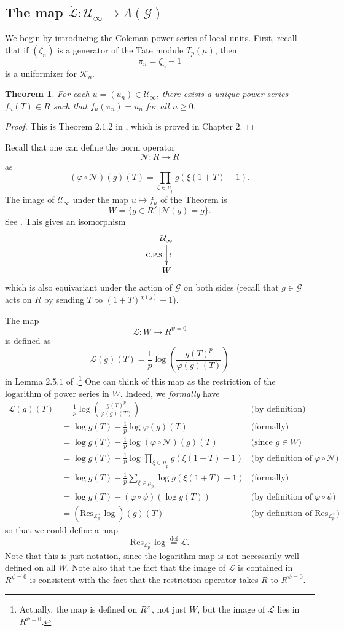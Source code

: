 \documentclass[twoside,10pt]{article}
\newtheorem{theorem}{Theorem}
\newcommand{\rarr}{\rightarrow}
\newcommand{\Z}{\mathbb{Z}}
\newcommand{\curlG}{\mathcal{G}}
\newcommand{\curlU}{\mathcal{U}}
\newcommand{\curlK}{\mathcal{K}}
\newcommand{\curlN}{\mathcal{N}}
\newcommand{\curlL}{\mathcal{L}}
\newcommand{\eqdef}{\overset{\text{def}}{=}}
\newcommand{\Res}{\text{Res}_{\Z_p^\times}}
\begin{document}
\subsection{The map $\tilde{\curlL}:\curlU_\infty\rarr\Lambda(\curlG)$}
We begin by introducing the Coleman power series of local units. First, recall that if $(\zeta_n)$ is a generator of the Tate module $T_p(\mu)$, then
\[\pi_n=\zeta_n-1\]
is a uniformizer for $\curlK_n$.

\begin{theorem}
	For each $u=(u_n)\in\curlU_\infty$, there exists a unique power series $f_u(T)\in R$ such that $f_u(\pi_n)=u_n$ for all $n\geq0$.
\end{theorem}
\begin{proof}
	This is Theorem $2.1.2$ in \cite{CS}, which is proved in Chapter $2$.
\end{proof}

Recall that one can define the norm operator
\[\curlN:R\rarr R\]
as
\[(\varphi\circ\curlN)(g)(T)=\prod_{\xi\in\mu_p}g(\xi(1+T)-1).\]
The image of $\curlU_\infty$ under the map $u\mapsto f_u$ of the Theorem is
\[W=\{g\in R^\times|\curlN(g)=g\}.\]
See \cite[Corollary 2.3.7]{CS}. This gives an isomorphism
\[\xymatrix{
\curlU_\infty\ar[d]_{\text{C.P.S.}}^{\wr}\\
W
}\]
which is also equivariant under the action of $\curlG$ on both sides (recall that $g\in\curlG$ acts on $R$ by sending $T$ to $(1+T)^{\chi(g)}-1$).

The map
\[\curlL:W\rarr R^{\psi=0}\]
is defined as
\[\curlL(g)(T)=\frac{1}{p}\log\left (\frac{g(T)^p}{\varphi(g)(T)}\right )\]
in Lemma $2.5.1$ of \cite{CS}.\footnote{Actually, the map is defined on $R^\times$, not just $W$, but the image of $\curlL$ lies in $R^{\psi=0}$.} One can think of this map as the restriction of the logarithm of power series in $W$. Indeed, we \emph{formally} have
\begin{align*}
	\curlL(g)(T)	&= \frac{1}{p}\log\left (\frac{g(T)^p}{\varphi(g)(T)}\right ) 	&\text{(by definition)}\\
					&= \log g(T) - \frac{1}{p}\log\varphi(g)(T)						&\text{(formally)}\\
					&= \log g(T) - \frac{1}{p}\log(\varphi\circ\curlN)(g)(T)		&\text{(since $g\in W$)}\\
					&= \log g(T) - \frac{1}{p}\log\prod_{\xi\in\mu_p}g(\xi(1+T)-1)	&\text{(by definition of $\varphi\circ\curlN$)}\\
					&= \log g(T) - \frac{1}{p}\sum_{\xi\in\mu_p}\log g(\xi(1+T)-1)	&\text{(formally)}\\
					&= \log g(T) - (\varphi\circ\psi)(\log g(T))					&\text{(by definition of $\varphi\circ\psi$)}\\
					&= (\Res\log)(g)(T)											&\text{(by definition of $\Res$)}
\end{align*}
so that we could define a map
\[\Res\log\eqdef\curlL.\]
Note that this is just notation, since the logarithm map is not necessarily well-defined on all $W$. Note also that the fact that the image of $\curlL$ is contained in $R^{\psi=0}$ is consistent with the fact that the restriction operator takes $R$ to $R^{\psi=0}$.
\end{document}
